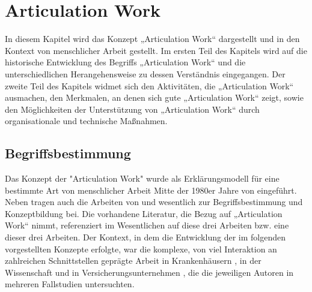 \chapter{Articulation Work} %
\label{cha:articulation_work}

In diesem Kapitel wird das Konzept „Articulation Work“ dargestellt und in den Kontext von menschlicher Arbeit gestellt. Im ersten Teil des Kapitels wird auf die historische Entwicklung des Begriffs „Articulation Work“ und die unterschiedlichen Herangehensweise zu dessen Verständnis eingegangen. Der zweite Teil des Kapitels widmet sich den Aktivitäten, die „Articulation Work“ ausmachen, den Merkmalen, an denen sich gute „Articulation Work“ zeigt, sowie den Möglichkeiten der Unterstützung von „Articulation Work“ durch organisationale und technische Maßnahmen.

\section{Begriffsbestimmung} %
\label{sec:aw_begriffsbestimmung}

Das Konzept der "Articulation Work" wurde als Erklärungsmodell für eine bestimmte Art von menschlicher Arbeit Mitte der 1980er Jahre von \citet{Strauss85} eingeführt. Neben \citet{Strauss85} tragen auch die Arbeiten von \citet{Gerson86} und \citet{Fujimura87} wesentlich zur Begriffsbestimmung und Konzeptbildung bei. Die vorhandene Literatur, die Bezug auf „Articulation Work“ nimmt, referenziert im Wesentlichen auf diese drei Arbeiten bzw. eine dieser drei Arbeiten. Der Kontext, in dem die Entwicklung der im folgenden vorgestellten Konzepte erfolgte, war die komplexe, von viel Interaktion an zahlreichen Schnittstellen geprägte Arbeit in Krankenhäusern \citep{Strauss85}, in der Wissenschaft \citep{Fujimura87} und in Versicherungsunternehmen \citep{Gerson86}, die die jeweiligen Autoren in mehreren Fallstudien untersuchten. 

